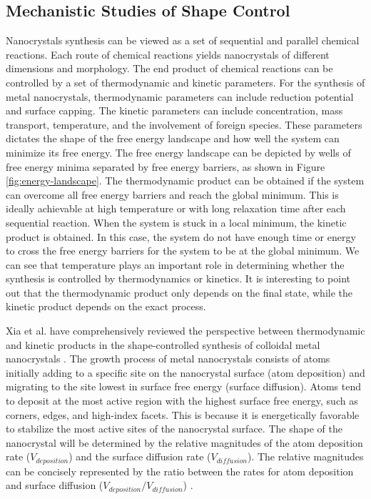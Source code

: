 \subsection{Mechanistic Studies of Shape Control}


Nanocrystals synthesis can be viewed as a set of sequential and parallel chemical reactions.
Each route of chemical reactions yields nanocrystals of different dimensions and morphology.
The end product of chemical reactions can be controlled by a set of thermodynamic and kinetic parameters.
For the synthesis of metal nanocrystals, thermodynamic parameters can include reduction potential and surface capping.
The kinetic parameters can include concentration, mass transport, temperature, and the involvement of foreign species.
These parameters dictates the shape of the free energy landscape and how well the system can minimize its free energy.
The free energy landscape can be depicted by wells of free energy minima separated by free energy barriers, as shown in Figure \ref{fig:energy-landscape}.
The thermodynamic product can be obtained if the system can overcome all free energy barriers and reach the global minimum.
This is ideally achievable at high temperature or with long relaxation time after each sequential reaction.
When the system is stuck in a local minimum, the kinetic product is obtained.
In this case, the system do not have enough time or energy to cross the free energy barriers for the system to be at the global minimum.
We can see that temperature plays an important role in determining whether the synthesis is controlled by thermodynamics or kinetics.
It is interesting to point out that the thermodynamic product only depends on the final state, while the kinetic product depends on the exact process.

Xia et al. have comprehensively reviewed the perspective between thermodynamic and kinetic products in the shape-controlled synthesis of colloidal metal nanocrystals \cite{Xia_2015}.
The growth process of metal nanocrystals consists of atoms initially adding to a specific site on the nanocrystal surface (atom deposition) and migrating to the site lowest in surface free energy (surface diffusion).
Atoms tend to deposit at the most active region with the highest surface free energy, such as corners, edges, and high-index facets.
This is because it is energetically favorable to stabilize the most active sites of the nanocrystal surface.
The shape of the nanocrystal will be determined by the relative magnitudes of the atom deposition rate ($V_{deposition}$) and the surface diffusion rate ($V_{diffusion}$).
The relative magnitudes can be concisely represented by the ratio between the rates for atom deposition and surface diffusion ($V_{deposition}/V_{diffusion}$) \cite{Xia_2013}.

